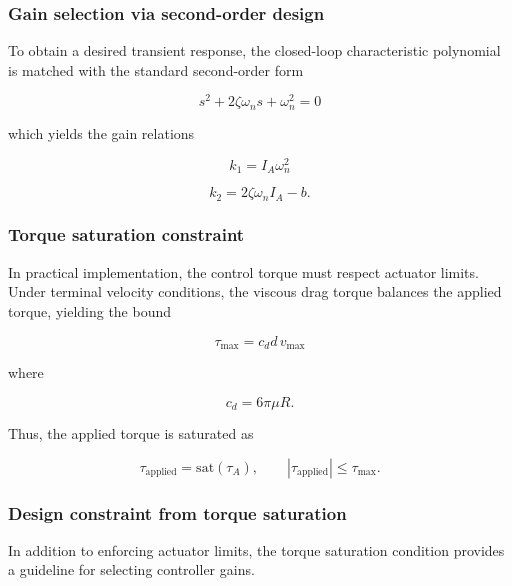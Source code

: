 \documentclass[journal]{IEEEtran}
\begin{document}
\subsubsection{Gain selection via second-order design}

To obtain a desired transient response, the closed-loop characteristic polynomial is matched with the standard second-order form

\begin{equation}
s^2 + 2\zeta \omega_n s + \omega_n^2 = 0
\end{equation}

which yields the gain relations

\begin{equation}
k_1 = I_A \omega_n^2
\end{equation}

\begin{equation}
k_2 = 2\zeta \omega_n I_A - b.
\end{equation}
\subsubsection{Torque saturation constraint}

In practical implementation, the control torque must respect actuator limits. Under terminal velocity conditions, the viscous drag torque balances the applied torque, yielding the bound

\begin{equation}
\tau_{\max} = c_d d\, v_{\max}
\end{equation}

where

\begin{equation}
c_d = 6\pi \mu R.
\end{equation}

Thus, the applied torque is saturated as

\begin{equation}
\tau_{\mathrm{applied}} = \mathrm{sat}(\tau_A),
\qquad
|\tau_{\mathrm{applied}}| \le \tau_{\max}.
\end{equation}
\subsubsection{Design constraint from torque saturation}

In addition to enforcing actuator limits, the torque saturation condition provides a guideline for selecting controller gains.
\end{document}
